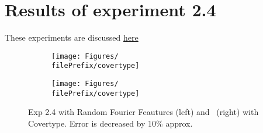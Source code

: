 
\newcommand{\major}{2}
\newcommand{\minor}{4}

\newcommand{\undPrefix}{\major_\minor}
\newcommand{\dotPrefix}{\major.\minor}
\newcommand{\scoPrefix}{\major-\minor}
\newcommand{\filePrefix}{\undPrefix/rff}

\chapter{Results of experiment \dotPrefix} %


\label{Appendix\scoPrefix} %

These experiments are discussed \hyperref[disc:h2]{here}



\begin{figure}[H]
  \centering
  \renewcommand{\filePrefix}{\undPrefix/rff}
  \begin{subfigure}[t]{0.5\linewidth}
    \centering\captionsetup{width=.8\linewidth}\texttt{[image: Figures/\\filePrefix/covertype]}
    \label{fig:\undPrefix_covertype}
  \end{subfigure}%
  \renewcommand{\filePrefix}{\undPrefix/nys}%
  \begin{subfigure}[t]{0.5\linewidth}
    \centering\captionsetup{width=.8\linewidth}\texttt{[image: Figures/\\filePrefix/covertype]}
    \label{fig:\undPrefix_covertype}
  \end{subfigure}%
  \caption*{Exp 2.4 with Random Fourier Feautures (left) and \Nys\ (right) with Covertype. Error is decreased by 10\% approx.}
\end{figure}


